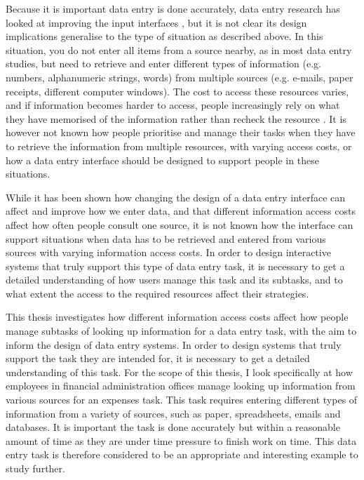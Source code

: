 \documentclass[11pt,oneside]{report}
\begin{document}
Because it is important data entry is done accurately, data entry research has looked at improving the input interfaces \citep[e.g.][]{Oladimeji2013, Vertanen2015, Wiseman2013a}, but it is not clear its design implications generalise to the type of situation as described above. In this situation, you do not enter all items from a source nearby, as in most data entry studies, but need to retrieve and enter different types of information (e.g. numbers, alphanumeric strings, words) from multiple sources (e.g. e-mails, paper receipts, different computer windows). The cost to access these resources varies, and if information becomes harder to access, people increasingly rely on what they have memorised of the information rather than recheck the resource \citep{Gray2006}. It is however not known how people prioritise and manage their tasks when they have to retrieve the information from multiple resources, with varying access costs, or how a data entry interface should be designed to support people in these situations. 

While it has been shown how changing the design of a data entry interface can affect and improve how we enter data, and that different information access costs affect how often people consult one source, it is not known how the interface can support situations when data has to be retrieved and entered from various sources with varying information access costs. In order to design interactive systems that truly support this type of data entry task, it is necessary to get a detailed understanding of how users manage this task and its subtasks, and to what extent the access to the required resources affect their strategies.

This thesis investigates how different information access costs affect how people manage subtasks of looking up information for a data entry task, with the aim to inform the design of data entry systems. 
In order to design systems that truly support the task they are intended for, it is necessary to get a detailed understanding of this task. 
For the scope of this thesis, I look specifically at how employees in financial administration offices manage looking up information from various sources for an expenses task. This task requires entering different types of information from a variety of sources, such as paper, spreadsheets, emails and databases. It is important the task is done accurately but within a reasonable amount of time as they are under time pressure to finish work on time. This data entry task is therefore considered to be an appropriate and interesting example to study further. 
\end{document}
